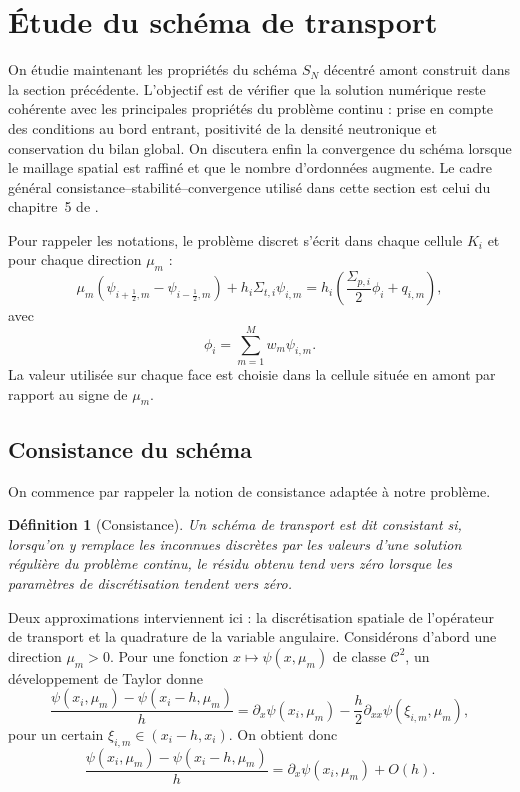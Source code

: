 \documentclass{article}
\newtheorem{definition}[theorem]{Définition}
\begin{document}
\section {Étude du schéma de transport}
\label{subsec:etude-schema-transport}

On étudie maintenant les propriétés du schéma $S_N$ décentré amont construit dans la section précédente. L'objectif est de vérifier que la solution numérique reste cohérente avec les principales propriétés du problème continu : prise en compte des conditions au bord entrant, positivité de la densité neutronique et conservation du bilan global. On discutera enfin la convergence du schéma lorsque le maillage spatial est raffiné et que le nombre d'ordonnées augmente. Le cadre général consistance--stabilité--convergence utilisé dans cette section est celui du chapitre~5 de \textcite{Allaire2018}.

Pour rappeler les notations, le problème discret s'écrit dans chaque cellule $K_i$ et pour chaque direction $\mu_m$ :
\begin{equation}
    \mu_m
    ( \psi_{i+\frac12,m} - \psi_{i-\frac12,m})
    + h_i\Sigma_{t,i}\psi_{i,m}
    = h_i \left( \frac{\Sigma_{p,i}}{2}\phi_i +q_{i,m} \right),
    \label{eq:transport-discret-rappel}
\end{equation}
avec
\begin{equation}
    \phi_i = \sum_{m=1}^{M}w_m\psi_{i,m}.
    \label{eq:flux-scalaire-discret-rappel}
\end{equation}
La valeur utilisée sur chaque face est choisie dans la cellule située en amont par rapport au signe de $\mu_m$.

\subsection {Consistance du schéma}

On commence par rappeler la notion de consistance adaptée à notre problème.

\begin{definition}[Consistance]
Un schéma de transport est dit consistant si, lorsqu'on y remplace les inconnues discrètes par les valeurs d'une solution régulière du problème continu, le résidu obtenu tend vers zéro lorsque les paramètres de discrétisation tendent vers zéro.
\end{definition}

Deux approximations interviennent ici : la discrétisation spatiale de l'opérateur de transport et la quadrature de la variable angulaire. Considérons d'abord une direction $\mu_m>0$. Pour une fonction $x\mapsto\psi(x,\mu_m)$ de classe $\mathcal C^2$, un développement de Taylor donne
\[
    \frac{\psi(x_i,\mu_m)-\psi(x_i-h,\mu_m)}{h}
    =\partial_x\psi(x_i,\mu_m)
    -\frac{h}{2} \partial_{xx}\psi(\xi_{i,m},\mu_m),
\]
pour un certain $\xi_{i,m}\in(x_i-h,x_i)$. On obtient donc
\[
    \frac{\psi(x_i,\mu_m)-\psi(x_i-h,\mu_m)}{h}
    =\partial_x\psi(x_i,\mu_m)+O(h).
\]
\end{document}
